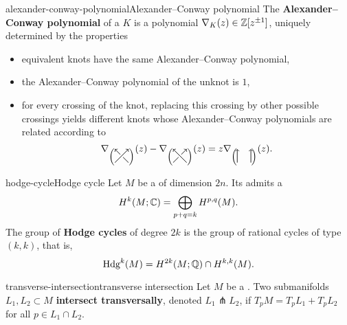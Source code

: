 \begin{topic}{alexander-conway-polynomial}{Alexander--Conway polynomial}
    The \textbf{Alexander--Conway polynomial} of a  $K$ is a polynomial $\nabla_K(z) \in \mathbb{Z}[z^{\pm 1}]$, uniquely determined by the properties
    \begin{itemize}
        \item equivalent knots have the same Alexander--Conway polynomial,
        \item the Alexander--Conway polynomial of the unknot is $1$,
        \item for every crossing of the knot, replacing this crossing by other possible crossings yields different knots whose Alexander--Conway polynomials are related according to
        \[ \svg \nabla_{\left( \begin{tikzpicture}[semithick, scale=0.5, baseline=1ex] 
            \draw [-to] (0, 0) -- (1, 1);
            \draw (1, 0) -- (0.6, 0.4);
            \draw [-to] (0.4, 0.6) -- (0, 1);
        \end{tikzpicture} \right)}(z) - \nabla_{\left( \begin{tikzpicture}[semithick, scale=0.5, baseline=1ex]
            \draw (0, 0) -- (0.4, 0.4);
            \draw [-to] (0.6, 0.6) -- (1, 1);
            \draw [-to] (1, 0) -- (0, 1);
        \end{tikzpicture} \right)}(z) = z \nabla_{\left( \begin{tikzpicture}[semithick, scale=0.5, baseline=1ex]
            \draw [-to] (0, 0) -- (0, 1);
            \draw [-to] (1, 0) -- (1, 1);
        \end{tikzpicture} \right)}(z) . \]
    \end{itemize}
\end{topic}

\begin{topic}{hodge-cycle}{Hodge cycle}
    Let $M$ be a   of dimension $2n$.  Its  admits a 
    \[ H^k(M; \mathbb{C}) = \bigoplus_{p + q = k} H^{p, q}(M) . \]
    The group of \textbf{Hodge cycles} of degree $2k$ is the group of rational cycles of type $(k, k)$, that is,
    \[ \textup{Hdg}^k(M) = H^{2k}(M; \mathbb{Q}) \cap H^{k, k}(M) . \]
\end{topic}

\begin{topic}{transverse-intersection}{transverse intersection}
    Let $M$ be a . Two submanifolds $L_1, L_2 \subset M$ \textbf{intersect transversally}, denoted $L_1 \pitchfork L_2$, if $T_p M = T_p L_1 + T_p L_2$ for all $p \in L_1 \cap L_2$.
\end{topic}


